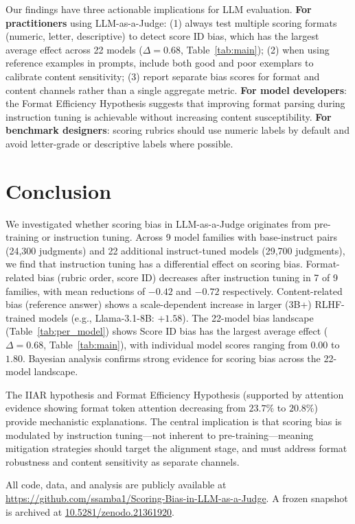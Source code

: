 \documentclass[11pt,preprint,nonatbib]{article}
\begin{document}
Our findings have three actionable implications for LLM evaluation. \textbf{For practitioners} using LLM-as-a-Judge: (1) always test multiple scoring formats (numeric, letter, descriptive) to detect score ID bias, which has the largest average effect across 22 models ($\Delta=0.68$, Table~\ref{tab:main}); (2) when using reference examples in prompts, include both good and poor exemplars to calibrate content sensitivity; (3) report separate bias scores for format and content channels rather than a single aggregate metric. \textbf{For model developers}: the Format Efficiency Hypothesis suggests that improving format parsing during instruction tuning is achievable without increasing content susceptibility. \textbf{For benchmark designers}: scoring rubrics should use numeric labels by default and avoid letter-grade or descriptive labels where possible.

\section{Conclusion}

We investigated whether scoring bias in LLM-as-a-Judge originates from pre-training or instruction tuning. Across 9 model families with base-instruct pairs (24,300 judgments) and 22 additional instruct-tuned models (29,700 judgments), we find that instruction tuning has a differential effect on scoring bias. Format-related bias (rubric order, score ID) decreases after instruction tuning in 7 of 9 families, with mean reductions of $-0.42$ and $-0.72$ respectively. Content-related bias (reference answer) shows a scale-dependent increase in larger (3B+) RLHF-trained models (e.g., Llama-3.1-8B: $+1.58$). The 22-model bias landscape (Table~\ref{tab:per_model}) shows Score ID bias has the largest average effect ($\Delta=0.68$, Table~\ref{tab:main}), with individual model scores ranging from $0.00$ to $1.80$. Bayesian analysis confirms strong evidence for scoring bias across the 22-model landscape.

The IIAR hypothesis and Format Efficiency Hypothesis (supported by attention evidence showing format token attention decreasing from $23.7\%$ to $20.8\%$) provide mechanistic explanations. The central implication is that scoring bias is modulated by instruction tuning---not inherent to pre-training---meaning mitigation strategies should target the alignment stage, and must address format robustness and content sensitivity as separate channels.

All code, data, and analysis are publicly available at \url{https://github.com/ssamba1/Scoring-Bias-in-LLM-as-a-Judge}. A frozen snapshot is archived at \href{https://doi.org/10.5281/zenodo.21361920}{10.5281/zenodo.21361920}.
\end{document}
